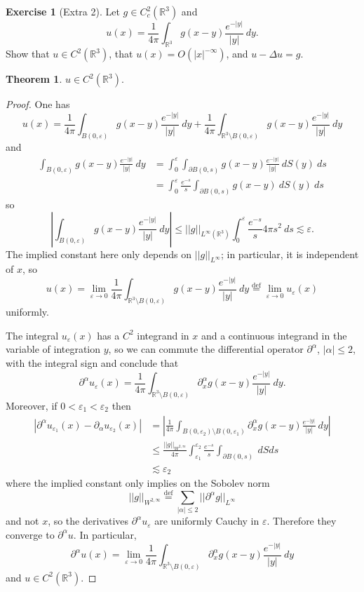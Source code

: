 \documentclass[10pt]{article}
\newcommand{\RR}{\mathbb{R}}
\def\defeq{\overset{\mathrm{def}}{=}}
\theoremstyle{definition}
\newtheorem{exer}{Exercise}
\newtheorem{theorem}[lemma]{Theorem}
\begin{document}
\begin{exer}[Extra 2]
Let $g \in C^2_c(\RR^3)$ and
$$u(x) = \frac{1}{4\pi} \int_{\RR^3} g(x-y) \frac{e^{-|y|}}{|y|}~dy.$$
Show that $u \in C^2(\RR^3)$, that $u(x) = O(|x|^{-\infty})$, and $u - \Delta u = g$.
\end{exer}

\begin{theorem}
$u \in C^2(\RR^3)$.
\end{theorem}
\begin{proof}
One has
$$u(x) = \frac{1}{4\pi} \int_{B(0, \varepsilon)} g(x - y) \frac{e^{-|y|}}{|y|}~dy + \frac{1}{4\pi} \int_{\RR^3 \setminus B(0, \varepsilon)} g(x - y) \frac{e^{-|y|}}{|y|}~dy$$
and
\begin{align*}
\int_{B(0, \varepsilon)} g(x - y) \frac{e^{-|y|}}{|y|}~dy
&= \int_0^\varepsilon \int_{\partial B(0, s)} g(x - y) \frac{e^{-|y|}}{|y|} ~dS(y) ~ds\\
&= \int_0^\varepsilon \frac{e^{-s}}{s} \int_{\partial B(0, s)} g(x - y) ~dS(y) ~ds
\end{align*}
so
$$\left|\int_{B(0, \varepsilon)} g(x - y) \frac{e^{-|y|}}{|y|}~dy\right| \leq ||g||_{L^\infty(\RR^3)} \int_0^\varepsilon \frac{e^{-s}}{s} 4\pi s^2~ds \lesssim \varepsilon.$$
The implied constant here only depends on $||g||_{L^\infty}$; in particular, it is independent of $x$, so
$$u(x) = \lim_{\varepsilon \to 0} \frac{1}{4\pi} \int_{\RR^3 \setminus B(0, \varepsilon)} g(x - y) \frac{e^{-|y|}}{|y|}~dy \defeq \lim_{\varepsilon \to 0} u_\varepsilon(x)$$
uniformly.

The integral $u_\varepsilon(x)$ has a $C^2$ integrand in $x$ and a continuous integrand in the variable of integration $y$, so we can commute the differential operator $\partial^\alpha$, $|\alpha| \leq 2$, with the integral sign and conclude that
$$\partial^\alpha u_\varepsilon(x) = \frac{1}{4\pi} \int_{\RR^3 \setminus B(0, \varepsilon)} \partial^\alpha_x g(x - y) \frac{e^{-|y|}}{|y|}~dy.$$
Moreover, if $0 < \varepsilon_1 < \varepsilon_2$ then
\begin{align*}|\partial^\alpha u_{\varepsilon_1}(x) - \partial_\alpha u_{\varepsilon_2}(x)| &= \left|\frac{1}{4\pi} \int_{B(0, \varepsilon_2) \setminus B(0, \varepsilon_1)} \partial^\alpha_x g(x - y) \frac{e^{-|y|}}{|y|}~dy\right|\\
&\leq \frac{||g||_{W^{2,\infty}}}{4\pi} \int_{\varepsilon_1}^{\varepsilon_2} \frac{e^{-s}}{s} \int_{\partial B(0, s)} ~dSds\\
&\lesssim \varepsilon_2
\end{align*}
where the implied constant only implies on the Sobolev norm
$$||g||_{W^{2, \infty}} \defeq \sum_{|\alpha| \leq 2} ||\partial^\alpha g||_{L^\infty}$$
and not $x$, so the derivatives $\partial^\alpha u_\varepsilon$ are uniformly Cauchy in $\varepsilon$.
Therefore they converge to $\partial^\alpha u$. In particular,
$$\partial^\alpha u(x) = \lim_{\varepsilon \to 0} \frac{1}{4\pi} \int_{\RR^3 \setminus B(0, \varepsilon)} \partial^\alpha_x g(x - y) \frac{e^{-|y|}}{|y|}~dy$$
and $u \in C^2(\RR^3)$.
\end{proof}
\end{document}
